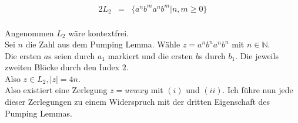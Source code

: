 \documentclass[10pt,a4paper,oneside,ngerman,numbers=noenddot]{scrartcl}
\begin{document}
\subsection{} %
\begin{alignat*}{2}
L_{2} &=& \{a^{n}b^{m}a^{n}b^{m} | n,m \geq 0\}
\end{alignat*}\\
Angenommen $L_{2}$ wäre kontextfrei.\\
Sei $n$ die Zahl aus dem Pumping Lemma. Wähle $z = a^{n}b^{n}a^{n}b^{n}$ mit $n \in \mathbb{N}$.\\
Die ersten $a$s seien durch $a_{1}$ markiert und die ersten $b$s durch $b_{1}$. Die jeweils zweiten Blöcke durch den Index $2$.\\
Also $z \in L_{2}, |z| = 4n$.\\
Also existiert eine Zerlegung $z = uvwxy$ mit $(i)$ und $(ii)$. Ich führe nun jede dieser Zerlegungen zu einem Widerspruch mit der dritten Eigenschaft des Pumping Lemmas.\\
\end{document}
